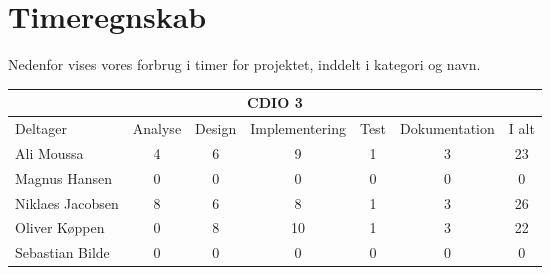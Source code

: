 \chapter*{Timeregnskab}

Nedenfor vises vores forbrug i timer for projektet, inddelt i kategori og navn.

\begin{table}[h]
    \centering
        \begin{tabular}{|l|c|c|c|c|c|c|}
                \hline
            \multicolumn{7}{|c|}{CDIO 3}
            \\ \hline
                    Deltager         &  Analyse  &  Design  &  Implementering  &  Test  &  Dokumentation  &  I alt
            \\ \hline
                    Ali Moussa       &    4      &    6     &        9         &    1   &        3        &    23
            \\ \hline
                    Magnus Hansen    &    0      &    0     &        0         &    0   &        0        &    0
            \\ \hline
                    Niklaes Jacobsen &    8      &    6     &        8         &    1   &        3        &    26
            \\ \hline
                    Oliver Køppen    &    0      &    8     &        10        &    1   &        3        &    22
            \\ \hline
                    Sebastian Bilde  &    0      &    0     &        0         &    0   &        0        &    0
            \\ \hline
        \end{tabular}
\end{table}